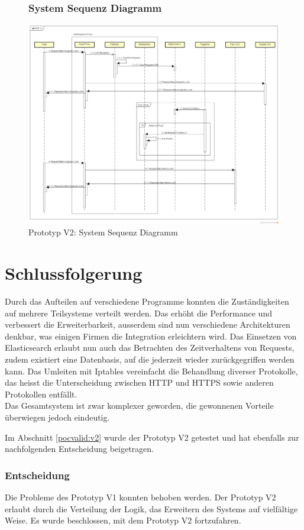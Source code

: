 \begin{figure}[H]
\subsubsection{System Sequenz Diagramm}
	\centering
	\includegraphics[width=\textwidth]{img/ssd.png}
	\caption{Prototyp V2: System Sequenz Diagramm}
	\label{fig:Prototyp_V2_System_Sequenz_Diagramm}
\end{figure}

\newpage
\section{Schlussfolgerung}
Durch das Aufteilen auf verschiedene Programme konnten die Zuständigkeiten auf mehrere Teilsysteme verteilt werden. Das erhöht die Performance und verbessert die Erweiterbarkeit, ausserdem sind nun verschiedene Architekturen denkbar, was einigen Firmen die Integration erleichtern wird. Das Einsetzen von Elasticsearch erlaubt nun auch das Betrachten des Zeitverhaltens von Requests, zudem existiert eine Datenbasis, auf die jederzeit wieder zurückgegriffen werden kann. Das Umleiten mit Iptables vereinfacht die Behandlung diverser Protokolle, das heisst die Unterscheidung zwischen HTTP und HTTPS sowie anderen Protokollen entfällt.\\

Das Gesamtsystem ist zwar komplexer geworden, die gewonnenen Vorteile überwiegen jedoch eindeutig.

Im Abschnitt \ref{pocvalid:v2} wurde der Prototyp V2 getestet und hat ebenfalls zur nachfolgenden Entscheidung beigetragen.

\subsubsection{Entscheidung}
Die Probleme des Prototyp V1 konnten behoben werden. Der Prototyp V2 erlaubt durch die Verteilung der Logik, das Erweitern des Systems auf vielfältige Weise. Es wurde beschlossen, mit dem Prototyp V2 fortzufahren.














